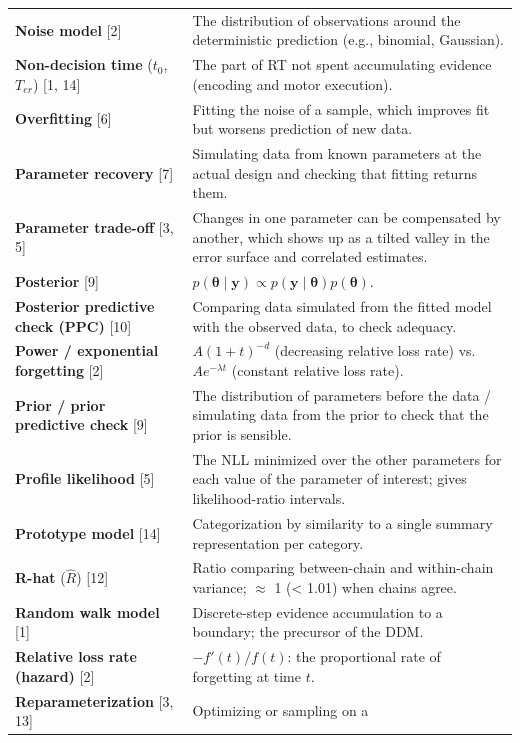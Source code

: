\begin{longtable}[]{@{}
  >{\raggedright\arraybackslash}p{}
  >{\raggedright\arraybackslash}p{}@{}}
\textbf{Noise model} {[}2{]} & The distribution of observations around
the deterministic prediction (e.g., binomial, Gaussian). \\
\textbf{Non-decision time} (\(t_0\), \(T_{er}\)) {[}1, 14{]} & The part
of RT not spent accumulating evidence (encoding and motor execution). \\
\textbf{Overfitting} {[}6{]} & Fitting the noise of a sample, which
improves fit but worsens prediction of new data. \\
\textbf{Parameter recovery} {[}7{]} & Simulating data from known
parameters at the actual design and checking that fitting returns
them. \\
\textbf{Parameter trade-off} {[}3, 5{]} & Changes in one parameter can
be compensated by another, which shows up as a tilted valley in the
error surface and correlated estimates. \\
\textbf{Posterior} {[}9{]} &
\(p(\boldsymbol\theta\mid\mathbf{y}) \propto p(\mathbf{y}\mid\boldsymbol\theta)p(\boldsymbol\theta)\). \\
\textbf{Posterior predictive check (PPC)} {[}10{]} & Comparing data
simulated from the fitted model with the observed data, to check
adequacy. \\
\textbf{Power / exponential forgetting} {[}2{]} & \(A(1+t)^{-d}\)
(decreasing relative loss rate) vs.~\(Ae^{-\lambda t}\) (constant
relative loss rate). \\
\textbf{Prior / prior predictive check} {[}9{]} & The distribution of
parameters before the data / simulating data from the prior to check
that the prior is sensible. \\
\textbf{Profile likelihood} {[}5{]} & The NLL minimized over the other
parameters for each value of the parameter of interest; gives
likelihood-ratio intervals. \\
\textbf{Prototype model} {[}14{]} & Categorization by similarity to a
single summary representation per category. \\
\textbf{R-hat} (\(\hat R\)) {[}12{]} & Ratio comparing between-chain and
within-chain variance; \ensuremath{\approx} 1 (\textless{} 1.01) when chains agree. \\
\textbf{Random walk model} {[}1{]} & Discrete-step evidence accumulation
to a boundary; the precursor of the DDM. \\
\textbf{Relative loss rate (hazard)} {[}2{]} & \(-f'(t)/f(t)\): the
proportional rate of forgetting at time \(t\). \\
\textbf{Reparameterization} {[}3, 13{]} & Optimizing or sampling on a

\end{longtable}
